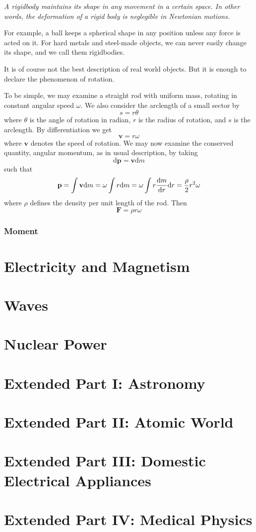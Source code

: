 \documentclass[12pt]{article}
\renewcommand{\d}[1]{\mathrm{d}{#1}}
\begin{document}
    \begin{center}
        \textit{A rigidbody maintains its shape in any movement in a certain space. In other words, the deformation of a rigid body is neglegible in Newtonian motions.}
    \end{center}

    For example, a ball keeps a spherical shape in any position unless any force is acted on it. For hard metals and steel-made objects, we can never easily change its shape, and we call them rigidbodies.

    It is of course not the best description of real world objects. But it is enough to declare the phenomenon of rotation.

    To be simple, we may examine a straight rod with uniform mass, rotating in constant angular speed $\omega$. We also consider the arclength of a small sector by \[s=r\theta\] where $\theta$ is the angle of rotation in radian, $r$ is the radius of rotation, and $s$ is the arclength. By differentiation we get \[\mathbf{v}=r\omega\] where $\mathbf{v}$ denotes the speed of rotation. We may now examine the conserved quantity, angular momentum, as in usual description, by taking \[\d{\mathbf{p}}=\mathbf{v}\d{m}\] such that \[\mathbf{p}=\int \mathbf{v} \d{m} = \omega \int r\d{m}=\omega \int r \derivative{m}{r} \d{r}=\frac{\rho}{2}r^2\omega\] where $\rho$ defines the density per unit length of the rod. Then \[\mathbf{F}=\rho r \omega \]

    \subsubsection*{Moment}

    \newpage
    \section{Electricity and Magnetism}

    \newpage
    \section{Waves}

    \newpage
    \section{Nuclear Power}

    \newpage
    \section{Extended Part I: Astronomy}

    \newpage
    \section{Extended Part II: Atomic World}

    \newpage
    \section{Extended Part III: Domestic Electrical Appliances}

    \newpage
    \section{Extended Part IV: Medical Physics}
\end{document}
